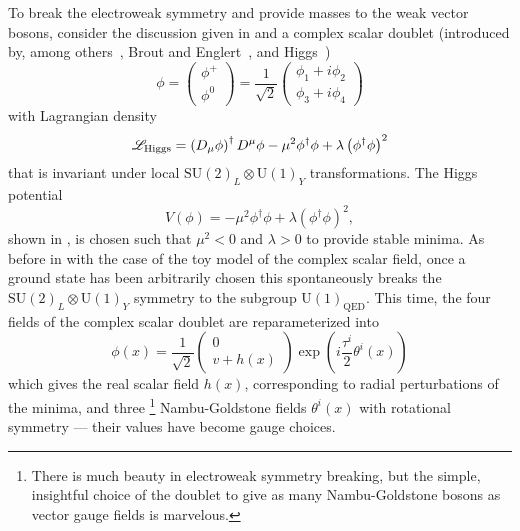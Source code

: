 To break the electroweak symmetry and provide masses to the weak vector bosons, consider the discussion given in  and a complex scalar doublet (introduced by, among others~\cite{Guralnik:1964eu,Kibble:2015mwa}, Brout and Englert~\cite{Englert:1964et}, and Higgs~\cite{Higgs:1964ia,Higgs:1964pj})
\begin{equation}
 \phi = \begin{pmatrix}%
  \phi^{+} \\%
  \phi^{0}
 \end{pmatrix} = \frac{1}{\sqrt{2}} \begin{pmatrix}%
  \phi_{1} + i \phi_{2} \\%
  \phi_{3} + i \phi_{4}%
 \end{pmatrix}%
 \label{eq:Higgs_doublet}
\end{equation}
with Lagrangian density
\begin{equation}
 \mathscr{L}_{\textrm{Higgs}} = \left(D_{\mu}\phi\right)^{\dagger}D^{\mu}\phi - \mu^{2}\phi^{\dagger}\phi + \lambda \left(\phi^{\dagger}\phi\right)^{2}
 \label{eq:Higgs_Lagrangian}
\end{equation}
that is invariant under local $\mathrm{SU}(2)_{L} \otimes \mathrm{U}(1)_{Y}$ transformations.
The Higgs potential
\begin{equation}
 V\left(\phi\right) = -\mu^{2}\phi^{\dagger}\phi + \lambda \left(\phi^{\dagger}\phi\right)^{2},
 \label{eq:Higgs_potential}
\end{equation}
shown in , is chosen such that $\mu^{2} < 0$ and $\lambda > 0$ to provide stable minima.
As before in  with the case of the toy model of the complex scalar field, once a ground state has been arbitrarily chosen this spontaneously breaks the $\mathrm{SU}(2)_{L} \otimes \mathrm{U}(1)_{Y}$ symmetry to the subgroup $\mathrm{U}(1)_{\textrm{QED}}$.
This time, the four fields of the complex scalar doublet are reparameterized into
\[
 \phi(x) = \frac{1}{\sqrt{2}} \begin{pmatrix}
  0 \\
  v + h(x)
 \end{pmatrix}
 \exp\left(i \frac{\tau^{i}}{2} \theta^{i}(x)\right)
\]
which gives the real scalar field $h(x)$, corresponding to radial perturbations of the minima, and three%
\footnote{There is much beauty in electroweak symmetry breaking, but the simple, insightful choice of the doublet to give as many Nambu-Goldstone bosons as vector gauge fields is marvelous.}
Nambu-Goldstone fields $\theta^{i}(x)$ with rotational symmetry --- their values have become gauge choices.
